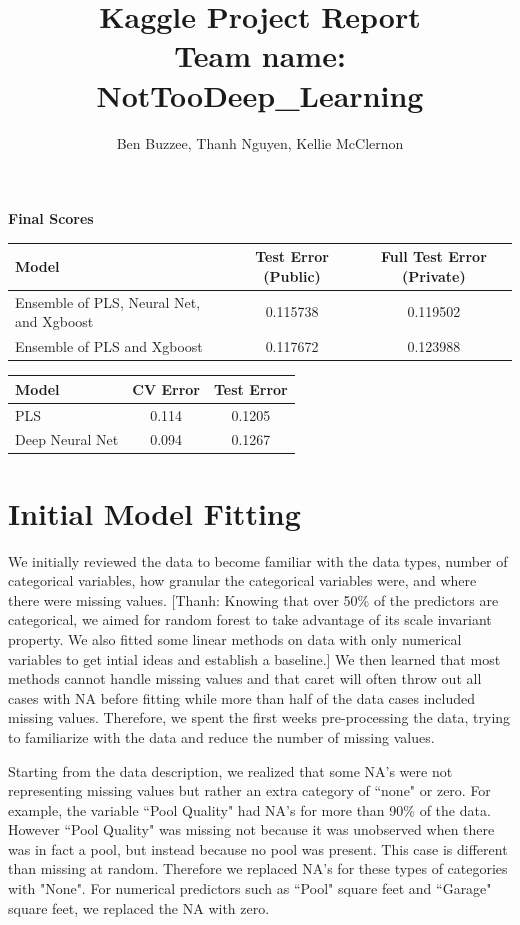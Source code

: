 \documentclass[12pt]{article}
\title{Kaggle Project Report \\ Team name: NotTooDeep\_Learning}
\author{Ben Buzzee, Thanh Nguyen, Kellie McClernon}
\newcommand{\thanh}[1]{{\color{blue} [Thanh: #1]}}
\begin{document}
\maketitle


\textbf{Final Scores}
\begin{center}
\begin{tabular}{l c c}
	\hline
	Model & Test Error (Public) & Full Test Error (Private) \\
	\hline
	Ensemble of PLS, Neural Net, and Xgboost & 0.115738 & 0.119502 \\
	Ensemble of PLS and Xgboost & 0.117672 & 0.123988 \\
	\hline
\end{tabular}
\end{center}

\begin{center}
\begin{tabular}{l c c}
	\hline
	Model & CV Error & Test Error\\
	\hline
	PLS & 0.114 & 0.1205 \\
	Deep Neural Net & 0.094 & 0.1267 \\
	\hline
\end{tabular}
\end{center}


\section{Initial Model Fitting}

We initially reviewed the data to become familiar with the data types, number of categorical variables, how granular the categorical variables were, and where there were missing values. \thanh{Knowing that over 50\% of the predictors are categorical, we aimed for random forest to take advantage of its scale invariant property. We also fitted some linear methods on data with only numerical variables to get intial ideas and establish a baseline.}  %
We then learned that most methods cannot handle missing values and that caret will often throw out all cases with NA before fitting while more than half of the data cases included missing values. %
Therefore, we spent the first weeks pre-processing the data, trying to familiarize with the data and reduce the number of missing values.

Starting from the data description, we realized that some NA's were not representing missing values but rather an extra category of ``none" or zero.  For example, the variable ``Pool Quality" had NA's for more than 90\% of the data.  However ``Pool Quality" was missing not because it was unobserved when there was in fact a pool, but instead because no pool was present.  This case is different than missing at random.  Therefore we replaced NA's for these types of categories with "None".  For numerical predictors such as ``Pool" square feet and ``Garage" square feet, we replaced the NA with zero.
\end{document}

